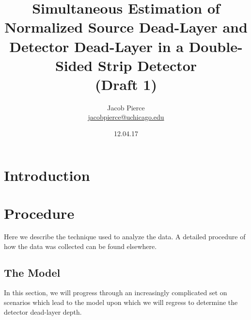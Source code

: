 \documentclass[11pt]{article}
\title{Simultaneous Estimation of Normalized Source Dead-Layer and Detector Dead-Layer in a Double-Sided Strip Detector \\ (Draft 1)}
\author{Jacob Pierce \\ \href{mailto:jacobpierce@uchicago.edu}{jacobpierce@uchicago.edu} }
\date{12.04.17}
\begin{document}
\thispagestyle{empty}

\maketitle


\begin{abstract}


\end{abstract}




\begin{multicols}{2}


\section{Introduction} 





\section{Procedure}

Here we describe the technique used to analyze the data. A detailed procedure of how the data was collected can be found elsewhere. 


\subsection{The Model}

In this section, we will progress through an increasingly complicated set on scenarios which lead to the model upon which we will regress to determine the detector dead-layer depth.


\end{multicols}
\end{document}
